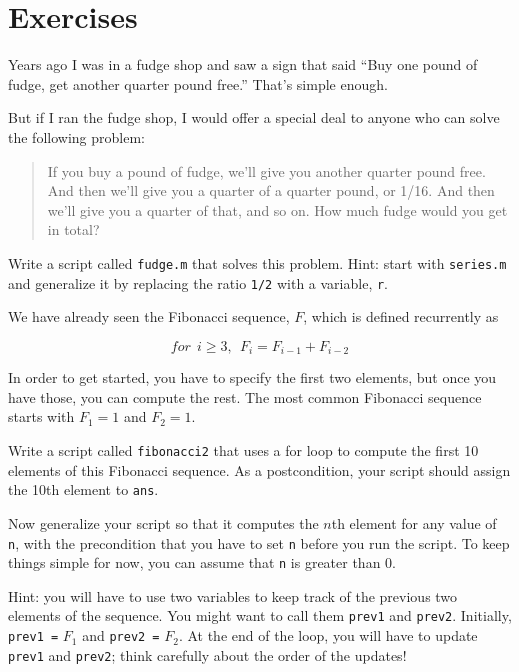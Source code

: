 \documentclass[
]{book}
\numberwithin{Answer}{chapter}
\numberwithin{Exercise}{chapter}
\begin{document}
\section{Exercises}

\begin{ex}
Years ago I was in a fudge shop and saw a sign that said ``Buy one pound of fudge, get another quarter pound free.''  That's simple enough.

But if I ran the fudge shop, I would offer a special deal to anyone who can solve the following problem:

\begin{quote}
If you buy a pound of fudge, we'll give you another quarter pound free.  And then we'll give you a quarter of a quarter pound, or 1/16.  And then we'll give you a quarter of that, and so on.  How much fudge would you get in total?
\end{quote}

Write a script called {\tt fudge.m} that solves this problem.  Hint: start with {\tt series.m} and generalize it by replacing the ratio {\tt 1/2} with a variable, {\tt r}.
\end{ex}



\begin{ex}
\label{ex:fib2}

We have already seen the Fibonacci sequence, $F$, which
is defined recurrently as

\[ for~~i \ge 3, ~~  F_{i} = F_{i-1} + F_{i-2} \]

In order to get started, you have to specify the first two
elements, but once you have those, you can compute the rest.
The most common Fibonacci sequence starts with $F_1 = 1$ and $F_2 = 1$.

Write a script called {\tt fibonacci2} that uses a for loop
to compute the first 10 elements of this Fibonacci sequence.
As a postcondition, your script should assign the 10th element to
{\tt ans}.

Now generalize your script so that it computes the $n$th element
for any value of {\tt n}, with the precondition that you have to
set {\tt n} before you run the script.  To keep things simple for
now, you can assume that {\tt n} is greater than 0.

Hint: you will have to use two variables to keep track of the
previous two elements of the sequence.  You might want to call
them {\tt prev1} and {\tt prev2}.  Initially, {\tt prev1 =} $F_1$
and {\tt prev2 =} $F_2$.  At the end of the loop, you will have
to update {\tt prev1} and {\tt prev2}; think carefully about the
order of the updates!
\end{ex}
\end{document}
